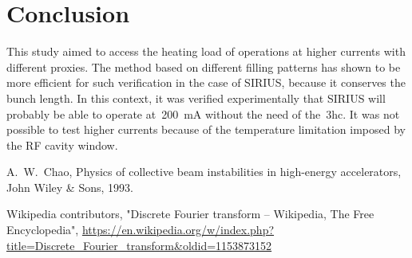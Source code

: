 \documentclass
[
    a4paper,
]{jacow}
\begin{document}
\section{Conclusion}

This study aimed to access the heating load of operations at higher currents with different proxies. The method based on different filling patterns has shown to be more efficient for such verification in the case of SIRIUS, because it conserves the bunch length. In this context, it was verified experimentally that SIRIUS will probably be able to operate at~\SI{200}{\milli\ampere} without the need of the~\gls{3hc}. It was not possible to test higher currents because of the temperature limitation imposed by the RF cavity window.
%
%
%
{\printbibliography}%
{%

    \begin{thebibliography}{9} %

        A.~W.~Chao,
        Physics of collective beam instabilities in high-energy accelerators,
        John Wiley \& Sons, 1993.
        
        Wikipedia contributors,
        "Discrete Fourier transform -- Wikipedia, The Free Encyclopedia",
        \url{https://en.wikipedia.org/w/index.php?title=Discrete_Fourier_transform&oldid=1153873152}
    \end{thebibliography}
} %
\end{document}
